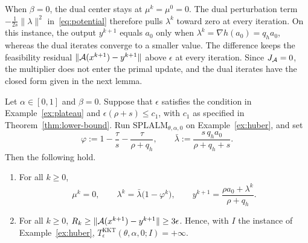 When \(\beta=0\), the dual center stays at \(\mu^k=\mu^0=0\). The dual
perturbation term \(-\frac{1}{2s}\|\lambda\|^2\) in~\eqref{eq:potential}
therefore pulls \(\lambda^k\) toward zero at every iteration. On this
instance, the output \(y^{k+1}\) equals \(a_0\) only when
\(\lambda^k=\nabla h(a_0)=q_ha_0\), whereas the dual iterates converge to a
smaller value. The difference keeps the feasibility residual
\(\|\mathcal{A}(x^{k+1})-y^{k+1}\|\) above \(\epsilon\) at every iteration. Since
\(J_{\mathcal{A}}=0\), the multiplier does not enter the primal update, and the
dual iterates have the closed form given in the next lemma.

\begin{lemma}
\label{lem:huber}
Let \(\alpha\in[0,1]\) and \(\beta=0\). Suppose that \(\epsilon\) satisfies
the condition in Example~\ref{ex:plateau} and \(\epsilon(\rho+s)\le c_1\),
with \(c_1\) as specified in Theorem~\ref{thm:lower-bound}. Run
\(\mathrm{SPLALM}_{\theta,\alpha,0}\) on Example~\ref{ex:huber}, and set
\[
\varphi:=1-\frac{\tau}{s}-\frac{\tau}{\rho+q_h},
\qquad
\bar\lambda:=\frac{s\,q_ha_0}{\rho+q_h+s}.
\]
Then the following hold.
\begin{enumerate}[label=(\roman*)]
\item For all \(k\ge0\),
  \[
  \mu^k=0,\qquad
  \lambda^k=\bar\lambda\bigl(1-\varphi^k\bigr),\qquad
  y^{k+1}=\frac{\rho a_0+\lambda^k}{\rho+q_h}.
  \]
\item For all \(k\ge0\),
  \(R_k\ge\|\mathcal{A}(x^{k+1})-y^{k+1}\|\ge3\epsilon\). Hence, with \(I\) the
  instance of Example~\ref{ex:huber},
  \(T^{\mathrm{KKT}}_\epsilon(\theta,\alpha,0;I)=+\infty\).
\end{enumerate}
\end{lemma}

